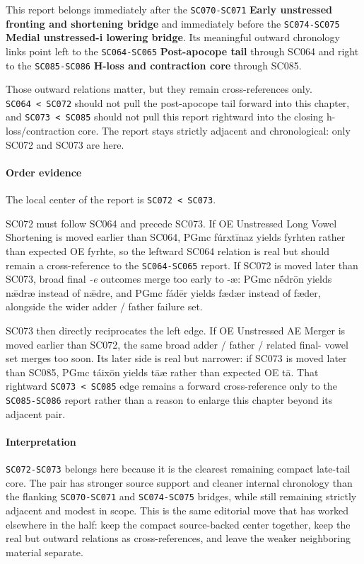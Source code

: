 \documentclass[
  british,
  a4paper,
]{article}
\begin{document}
This report belongs immediately after the \texttt{SC070-SC071}
\textbf{Early unstressed fronting and shortening bridge} and immediately
before the \texttt{SC074-SC075} \textbf{Medial unstressed-i lowering
bridge}. Its meaningful outward chronology links point left to the
\texttt{SC064-SC065} \textbf{Post-apocope tail} through SC064 and right
to the \texttt{SC085-SC086} \textbf{H-loss and contraction core} through
SC085.

Those outward relations matter, but they remain cross-references only.
\texttt{SC064\ \textless{}\ SC072} should not pull the post-apocope tail
forward into this chapter, and \texttt{SC073\ \textless{}\ SC085} should
not pull this report rightward into the closing h-loss/contraction core.
The report stays strictly adjacent and chronological: only SC072 and
SC073 are here.

\paragraph{Order evidence}\label{order-evidence-45}

The local center of the report is \texttt{SC072\ \textless{}\ SC073}.

SC072 must follow SC064 and precede SC073. If OE Unstressed Long Vowel
Shortening is moved earlier than SC064, PGmc fúrxtīnaz yields fyrhten
rather than expected OE fyrhte, so the leftward SC064 relation is real
but should remain a cross-reference to the \texttt{SC064-SC065} report.
If SC072 is moved later than SC073, broad final \emph{-e} outcomes merge
too early to -æ: PGmc nḗdrōn yields nǣdræ instead of nǣdre, and PGmc
fádēr yields fædær instead of fæder, alongside the wider adder / father
failure set.

SC073 then directly reciprocates the left edge. If OE Unstressed AE
Merger is moved earlier than SC072, the same broad adder / father /
related final- vowel set merges too soon. Its later side is real but
narrower: if SC073 is moved later than SC085, PGmc táixōn yields tāæ
rather than expected OE tā. That rightward
\texttt{SC073\ \textless{}\ SC085} edge remains a forward
cross-reference only to the \texttt{SC085-SC086} report rather than a
reason to enlarge this chapter beyond its adjacent pair.

\paragraph{Interpretation}\label{interpretation-45}

\texttt{SC072-SC073} belongs here because it is the clearest remaining
compact late-tail core. The pair has stronger source support and cleaner
internal chronology than the flanking \texttt{SC070-SC071} and
\texttt{SC074-SC075} bridges, while still remaining strictly adjacent
and modest in scope. This is the same editorial move that has worked
elsewhere in the half: keep the compact source-backed center together,
keep the real but outward relations as cross-references, and leave the
weaker neighboring material separate.
\end{document}
